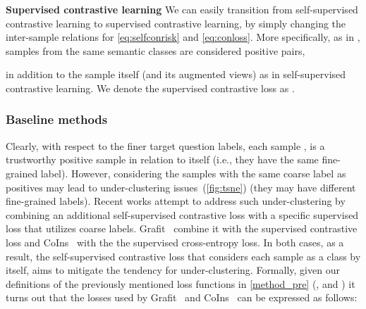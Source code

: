 \documentclass[10pt,twocolumn,letterpaper]{article}
\begin{document}
\noindent\textbf{Supervised contrastive learning}
\label{method_pre_supervisedcontrastivelearning}
We can easily transition from self-supervised contrastive learning to supervised contrastive learning, by simply changing the inter-sample relations  for \cref{eq:selfconrisk} and \cref{eq:conloss}. More specifically, as in \cite{nca, cns, supcon}, samples from the same semantic classes are considered positive pairs, 

in addition to the sample itself (and its augmented views) as in self-supervised contrastive learning. We denote the supervised contrastive loss as .


\subsubsection{Baseline methods}
Clearly, with respect to the finer target question labels, each sample , is a trustworthy positive sample in relation to itself (i.e., they have the same fine-grained label). However, considering the samples with the same coarse label as positives may lead to under-clustering issues~(\cref{fig:tsne}) (they may have different fine-grained labels). 
Recent works attempt to address such under-clustering by combining an additional self-supervised contrastive loss with a specific supervised loss that utilizes coarse labels. Grafit~\cite{touvron2021grafit} combine it with the supervised contrastive loss and CoIns~\cite{xu2021coins} with the the supervised cross-entropy loss. 
In both cases, as a result, the self-supervised contrastive loss that considers each sample as a class by itself, aims to mitigate the tendency for under-clustering. 
Formally, given our definitions of the previously mentioned loss functions in \cref{method_pre} (,  and ) it turns out that the losses used by Grafit~\cite{touvron2021grafit} and CoIns~\cite{xu2021coins} can be expressed as follows: 
\end{document}
